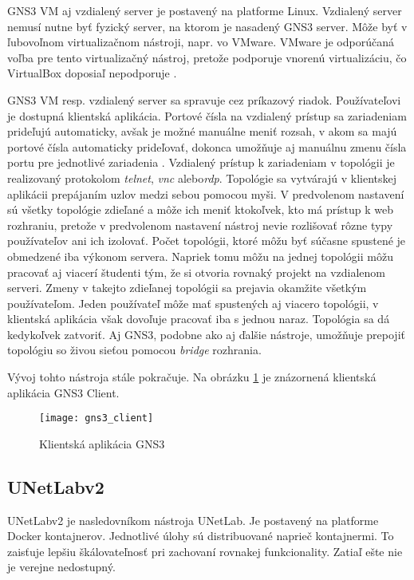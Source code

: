GNS3 VM aj vzdialený server je postavený na platforme Linux. Vzdialený server nemusí nutne byť fyzický server, na ktorom je nasadený GNS3 server. Môže byť v ľubovoľnom virtualizačnom nástroji, napr. vo VMware. VMware je odporúčaná voľba pre tento virtualizačný nástroj, pretože podporuje vnorenú virtualizáciu, čo VirtualBox doposiaľ nepodporuje \cite{nested_virtualization}.

GNS3 VM resp. vzdialený server sa spravuje cez príkazový riadok. Používateľovi je dostupná klientská aplikácia. Portové čísla na vzdialený prístup sa zariadeniam prideľujú automaticky, avšak je možné manuálne meniť rozsah, v akom sa majú portové čísla automaticky prideľovať, dokonca umožňuje aj manuálnu zmenu čísla portu pre jednotlivé zariadenia \cite{gns3_console_ports, gns3_console_ports_remote}. Vzdialený prístup k zariadeniam v topológii je realizovaný protokolom \emph{telnet}, \emph{vnc} alebo\emph{rdp}. Topológie sa vytvárajú v klientskej aplikácii prepájaním uzlov medzi sebou pomocou myši. V predvolenom nastavení sú všetky topológie zdieľané a môže ich meniť ktokoľvek, kto má prístup k web rozhraniu, pretože v predvolenom nastavení nástroj nevie rozlišovať rôzne typy používateľov ani ich izolovať. Počet topológii, ktoré môžu byť súčasne spustené je obmedzené iba výkonom servera. Napriek tomu môžu na jednej topológii môžu pracovať aj viacerí študenti tým, že si otvoria rovnaký projekt na vzdialenom serveri. Zmeny v takejto zdieľanej topológii sa prejavia okamžite všetkým používateľom. Jeden používateľ môže mať spustených aj viacero topológii, v klientská aplikácia však dovoľuje pracovať iba s jednou naraz. Topológia sa dá kedykoľvek zatvoriť. Aj GNS3, podobne ako aj ďalšie nástroje, umožňuje prepojiť topológiu so živou sieťou pomocou \emph{bridge} rozhrania.

Vývoj tohto nástroja stále pokračuje. Na obrázku \ref{obr:gns3_client} je znázornená klientská aplikácia GNS3 Client.

\begin{figure}
    \centering
    \texttt{[image: gns3\_client]}
    \caption{Klientská aplikácia GNS3}
    \label{obr:gns3_client}
\end{figure}

\subsection{UNetLabv2}

UNetLabv2 je nasledovníkom nástroja UNetLab. Je postavený na platforme Docker kontajnerov. Jednotlivé úlohy sú distribuované naprieč kontajnermi. To zaisťuje lepšiu škálovateľnosť pri zachovaní rovnakej funkcionality. Zatiaľ ešte nie je verejne nedostupný.

